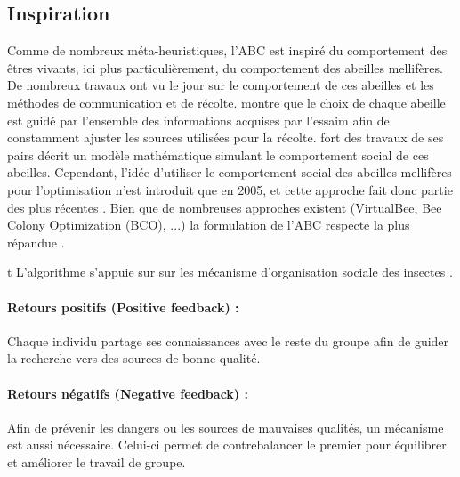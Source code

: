 
\subsection{Inspiration} %
\label{sub:inspiration}
Comme de nombreux méta-heuristiques, l’ABC est inspiré du comportement des êtres
vivants, ici plus particulièrement, du comportement des abeilles mellifères. De nombreux
travaux ont vu le jour sur le comportement de ces abeilles et les méthodes de
communication et de récolte. \cite{Visscher19821790} montre que le choix de chaque abeille
est guidé par l’ensemble des informations acquises par l’essaim afin de constamment
ajuster les sources utilisées pour la récolte.
\cite{Camazine1991547} fort des travaux de ses pairs décrit un modèle mathématique
simulant le comportement social de ces abeilles.
Cependant, l’idée d’utiliser le comportement social des abeilles mellifères pour l’optimisation
n’est introduit que en 2005, et cette approche fait donc partie des plus récentes \parencite{Karaboga2005}.
Bien que de nombreuses approches existent (VirtualBee, Bee Colony Optimization (BCO), ...)
la formulation de l’ABC respecte la plus répandue \parencite{Karaboga201221}.


t\label{sub:principe_de_fonctionnement}
L’algorithme s’appuie sur sur les mécanisme d’organisation sociale des insectes \parencite{Bonabeau1999}.
\paragraph{Retours positifs (Positive feedback) :} %
\label{par:positive_feedback}
Chaque individu partage ses connaissances avec le reste du groupe afin de guider
la recherche vers des sources de bonne qualité.

\paragraph{Retours négatifs (Negative feedback) :} %
\label{par:negative_feedback}
Afin de prévenir les dangers ou les sources de mauvaises qualités, un mécanisme est
aussi nécessaire. Celui-ci permet de contrebalancer le premier pour équilibrer
et améliorer le travail de groupe.

